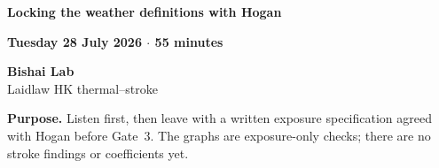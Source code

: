 \documentclass[11pt,a4paper]{article}
\begin{document}
\begin{minipage}[t]{0.72\textwidth}
  {\fontsize{17}{19}\selectfont\color{LaidlawNavy}\bfseries
  Locking the weather definitions with Hogan}\par
  \vspace{0.2em}
  {\color{LaidlawTeal}\bfseries Tuesday 28 July 2026 \(\cdot\) 55 minutes}
\end{minipage}
\hfill
\begin{minipage}[t]{0.25\textwidth}
  \raggedleft
  \colorbox{LaidlawSoft}{\parbox{0.88\linewidth}{\centering\footnotesize
  \textbf{Bishai Lab}\\Laidlaw HK thermal--stroke}}
\end{minipage}

\vspace{0.45em}
\colorbox{LaidlawSoft}{%
  \parbox{\dimexpr\textwidth-2\fboxsep\relax}{\normalsize
  \textbf{\color{LaidlawNavy}Purpose.}
  Listen first, then leave with a written exposure specification agreed with
  Hogan before Gate~3. The graphs are exposure-only checks; there are no stroke
  findings or coefficients yet.}}
\end{document}
